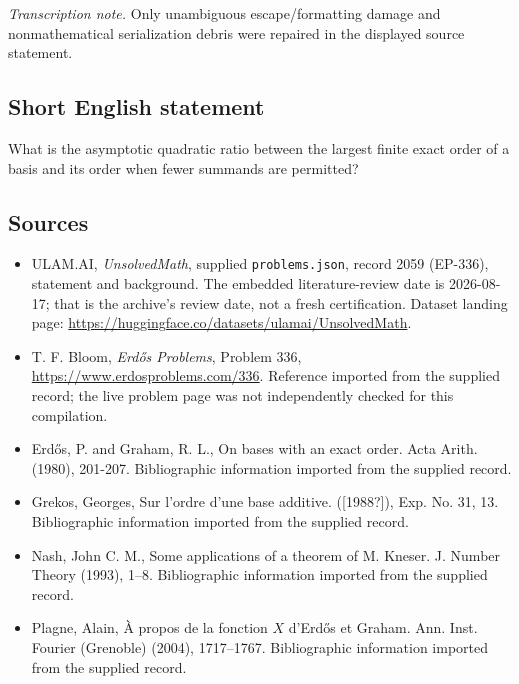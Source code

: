\documentclass[11pt,a4paper]{article}
\begin{document}
{\small\emph{Transcription note.} Only unambiguous escape/formatting damage and nonmathematical serialization debris were repaired in the displayed source statement.}

\subsection{Short English statement}

What is the asymptotic quadratic ratio between the largest finite exact order of a basis and its order when fewer summands are permitted?

\subsection{Sources}

{\small

\begin{itemize}

\item[\hypertarget{source:2059:1}{S1}] ULAM.AI, \emph{UnsolvedMath}, supplied \texttt{problems.json}, record 2059 (EP-336), statement and background. The embedded literature-review date is 2026-08-17; that is the archive’s review date, not a fresh certification. Dataset landing page: \url{https://huggingface.co/datasets/ulamai/UnsolvedMath}.

\item[\hypertarget{source:2059:2}{S2}] T. F. Bloom, \emph{Erdős Problems}, Problem 336, \url{https://www.erdosproblems.com/336}. Reference imported from the supplied record; the live problem page was not independently checked for this compilation.

\item[\hypertarget{source:2059:3}{S3}] Erd\H{o}s, P. and Graham, R. L., On bases with an exact order. Acta Arith. (1980), 201-207. Bibliographic information imported from the supplied record.

\item[\hypertarget{source:2059:4}{S4}] Grekos, Georges, Sur l'ordre d'une base additive. ([1988?]), Exp. No. 31, 13. Bibliographic information imported from the supplied record.

\item[\hypertarget{source:2059:5}{S5}] Nash, John C. M., Some applications of a theorem of {M}. {K}neser. J. Number Theory (1993), 1--8. Bibliographic information imported from the supplied record.

\item[\hypertarget{source:2059:6}{S6}] Plagne, Alain, \`A{} propos de la fonction {$X$} d'{E}rd\H{o}s et {G}raham. Ann. Inst. Fourier (Grenoble) (2004), 1717--1767. Bibliographic information imported from the supplied record.

\end{itemize}

}

\label{end:2059}
\end{document}
